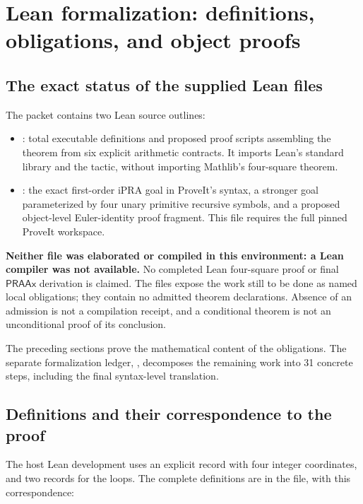 \section{Lean formalization: definitions, obligations, and object proofs}
\label{sec:formalization}

\subsection{The exact status of the supplied Lean files}

The packet contains two Lean source outlines:
\begin{itemize}
\item {}: total executable definitions and proposed
proof scripts assembling the theorem from six explicit arithmetic contracts.
It imports Lean's standard library and the  tactic, without
importing Mathlib's four-square theorem.
\item {}: the exact first-order iPRA goal in
ProveIt's syntax, a stronger goal parameterized by four unary primitive
recursive symbols, and a proposed object-level Euler-identity proof fragment.
This file requires the full pinned ProveIt workspace.
\end{itemize}

\textbf{Neither file was elaborated or compiled in this environment: a Lean
compiler was not available.} No completed Lean four-square proof or final
$\mathsf{PRAAx}$ derivation is claimed. The files expose the work still to
be done as named local obligations; they contain no admitted theorem
declarations. Absence of an admission is not a compilation receipt, and
a conditional theorem is not an unconditional proof of its conclusion.

The preceding sections prove the mathematical content of the obligations.
The separate formalization ledger, , decomposes the
remaining work into 31 concrete steps, including the final syntax-level
translation.

\subsection{Definitions and their correspondence to the proof}

The host Lean development uses an explicit record with four integer
coordinates, and two records for the loops. The complete definitions are in
the file, with this correspondence:

